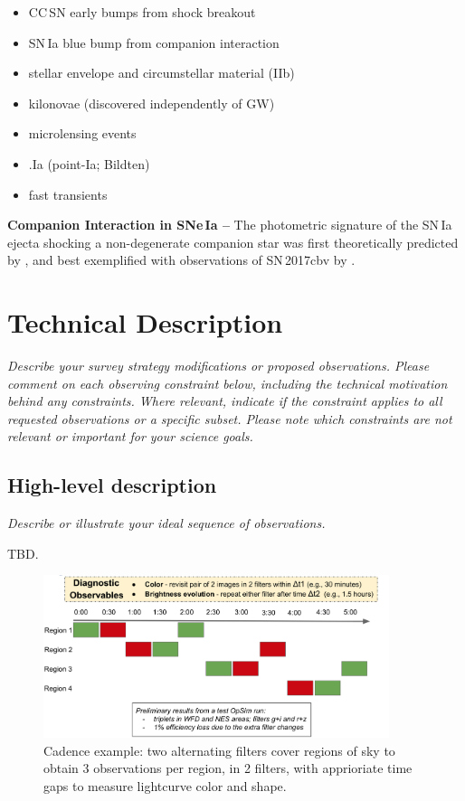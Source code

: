 \documentclass[11pt]{article}
\begin{document}
\begin{itemize}
    \item CC\,SN early bumps from shock breakout
    \item SN\,Ia blue bump from companion interaction
    \item stellar envelope and circumstellar material (IIb)
    \item kilonovae (discovered independently of GW)
    \item microlensing events
    \item .Ia (point-Ia; Bildten)
    \item fast transients \citep{2014ApJ...794...23D}
\end{itemize}

{\bf Companion Interaction in SNe\,Ia --} The photometric signature of the SN\,Ia ejecta shocking a non-degenerate companion star was first theoretically predicted by \cite{2010ApJ...708.1025K}, and best exemplified with observations of SN\,2017cbv by \cite{2017ApJ...845L..11H}. 



\clearpage
\section{Technical Description}
\begin{footnotesize}
{\it Describe your survey strategy modifications or proposed observations. Please comment on each observing constraint below, including the technical motivation behind any constraints. Where relevant, indicate if the constraint applies to all requested observations or a specific subset. Please note which constraints are not relevant or important for your science goals.}
\end{footnotesize}

\subsection{High-level description}
\begin{footnotesize}
{\it Describe or illustrate your ideal sequence of observations.}
\end{footnotesize}

TBD.
\begin{figure}[!h]
\includegraphics[width=0.9\textwidth]{figures/highLevelCadence.png}
\caption{Cadence example: two alternating filters cover regions of sky to obtain 3 observations per region, in 2 filters, with apprioriate time gaps to measure lightcurve color and shape.}
\end{figure}
\end{document}
